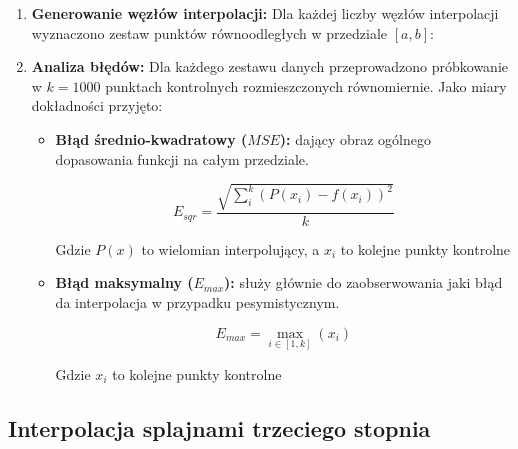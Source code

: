 \documentclass{article}
\begin{document}
\begin{enumerate}
    \item \textbf{Generowanie węzłów interpolacji:} Dla każdej liczby węzłów interpolacji wyznaczono zestaw punktów równoodległych w przedziale $[a, b]$:
    

    \item \textbf{Analiza błędów:} Dla każdego zestawu danych przeprowadzono próbkowanie w $k=1000$ punktach kontrolnych rozmieszczonych równomiernie. Jako miary dokładności przyjęto:
    \begin{itemize}
        \item \textbf{Błąd średnio-kwadratowy ($MSE$):} dający obraz ogólnego dopasowania funkcji na całym przedziale.
        
        \begin{center}
        \begin{Large}
            \[E_{sqr} = \frac{\sqrt{\sum_{i}^{k}(P(x_{i}) - f(x_{i}))^{2}}}{k}\]
        \end{Large}
        \end{center}  
        
        
        Gdzie $P(x)$ to wielomian interpolujący, a $x_{i}$ to kolejne punkty kontrolne 
        \item \textbf{Błąd maksymalny ($E_{max}$):} służy głównie do zaobserwowania jaki błąd da interpolacja w przypadku pesymistycznym.
        
        \begin{center}
        \begin{Large}
            \[E_{max}=\max_{i\in[1,k]}(x_{i})\]
        \end{Large}
        \end{center}
        
        Gdzie $x_{i}$ to kolejne punkty kontrolne
    \end{itemize}
\end{enumerate}

\subsection{Interpolacja splajnami trzeciego stopnia}
\end{document}
